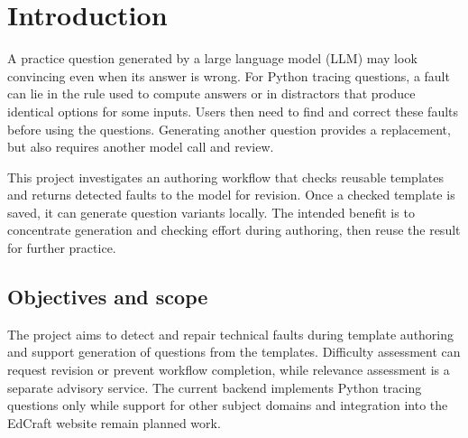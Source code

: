 \section{Introduction}\label{sec:introduction}

A practice question generated by a large language model (LLM) may look convincing even when its answer is wrong. For Python tracing questions, a fault can lie in the rule used to compute answers or in distractors that produce identical options for some inputs. Users then need to find and correct these faults before using the questions. Generating another question provides a replacement, but also requires another model call and review.

This project investigates an authoring workflow that checks reusable templates and returns detected faults to the model for revision. Once a checked template is saved, it can generate question variants locally. The intended benefit is to concentrate generation and checking effort during authoring, then reuse the result for further practice.

\subsection{Objectives and scope}\label{sec:introduction-1-1}

The project aims to detect and repair technical faults during template authoring and support generation of questions from the templates. Difficulty assessment can request revision or prevent workflow completion, while relevance assessment is a separate advisory service. The current backend implements Python tracing questions only while support for other subject domains and integration into the EdCraft website remain planned work.

